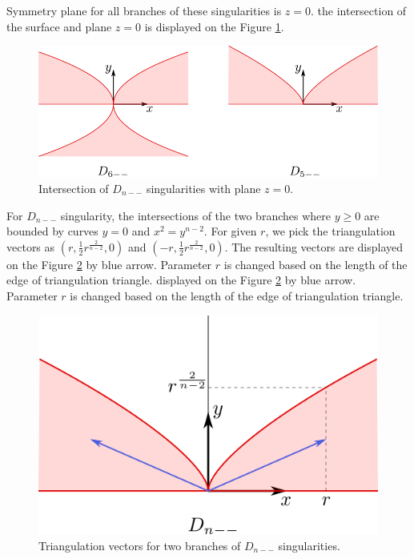 Symmetry plane for all branches of these singularities is $z=0$.
the intersection of the surface and plane $z=0$ is displayed on the Figure \ref{img:6}.

\begin{figure}
    \centerline{\includegraphics[scale=0.5]{images/img6}}
    \caption[Intersection of $D_{n--}$ singularities with plane $z=0$.]
    {Intersection of $D_{n--}$ singularities with plane $z=0$.}
    \label{img:6}
\end{figure}

For $D_{n--}$ singularity, the intersections of the two branches where
$y \geq 0$ are bounded by curves $y=0$ and $x^2=y^{n-2}$. For given $r$,
we pick the triangulation vectors as $(r, \frac{1}{2}r^{\frac{2}{n-2}}, 0)$
and $(-r, \frac{1}{2}r^{\frac{2}{n-2}}, 0)$. The resulting vectors are
displayed on the Figure \ref{img:9} by blue arrow. Parameter $r$ is changed based
on the length of the edge of triangulation triangle.
displayed on the Figure \ref{img:9} by blue arrow. Parameter $r$ is changed based
on the length of the edge of triangulation triangle.

\begin{figure}
    \centerline{\includegraphics[scale=0.5]{images/img9}}
    \caption[Triangulation vectors for two branches of $D_{n--}$ singularities.]
    {Triangulation vectors for two branches of $D_{n--}$ singularities.}
    \label{img:9}
\end{figure}

